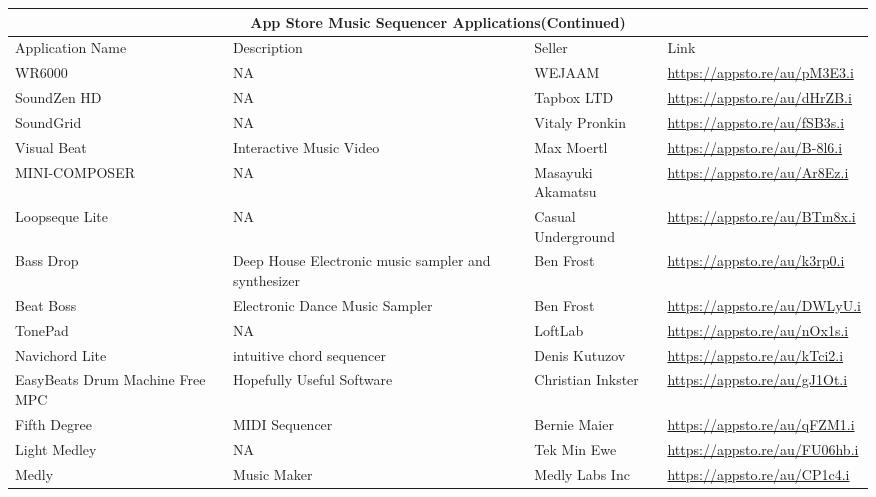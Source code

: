 \pagestyle{fancy}
\fancyfoot{}
\fancyfoot[C]{\thepage}

 \begin{tabular}{ |p{3cm}||p{3.5cm}|p{3.5cm}|p{3.5cm}||}
  \hline
  \multicolumn{4}{|c|}{App Store Music Sequencer Applications(Continued)} \\
  \hline
  Application Name   & Description  & Seller & Link\\
  \hline

  WR6000 & NA & WEJAAM &
  \url{https://appsto.re/au/pM3E3.i}\\

  SoundZen HD & NA & Tapbox LTD &
  \url{https://appsto.re/au/dHrZB.i}\\

  SoundGrid & NA & Vitaly Pronkin &
  \url{https://appsto.re/au/fSB3s.i}\\

  Visual Beat & Interactive Music Video & Max Moertl &
  \url{https://appsto.re/au/B-8l6.i}\\

  MINI-COMPOSER & NA & Masayuki Akamatsu &
  \url{https://appsto.re/au/Ar8Ez.i}\\

 Loopseque Lite & NA & Casual Underground &
 \url{https://appsto.re/au/BTm8x.i}\\

 Bass Drop & Deep House Electronic music sampler and synthesizer & Ben Frost &
 \url{https://appsto.re/au/k3rp0.i}\\

 Beat Boss & Electronic Dance Music Sampler & Ben Frost &
 \url{https://appsto.re/au/DWLyU.i}\\

 TonePad &NA& LoftLab &
 \url{https://appsto.re/au/nOx1s.i}\\

 Navichord Lite & intuitive chord sequencer & Denis Kutuzov &
 \url{https://appsto.re/au/kTci2.i}\\

 EasyBeats Drum Machine Free MPC & Hopefully Useful Software & Christian Inkster &
 \url{https://appsto.re/au/gJ1Ot.i}\\

 Fifth Degree & MIDI Sequencer & Bernie Maier &
 \url{https://appsto.re/au/qFZM1.i}\\

 Light Medley & NA & Tek Min Ewe &
 \url{https://appsto.re/au/FU06hb.i}\\

 Medly &  Music Maker & Medly Labs Inc &
 \url{https://appsto.re/au/CP1c4.i}\\
 \hline

\end{tabular}
